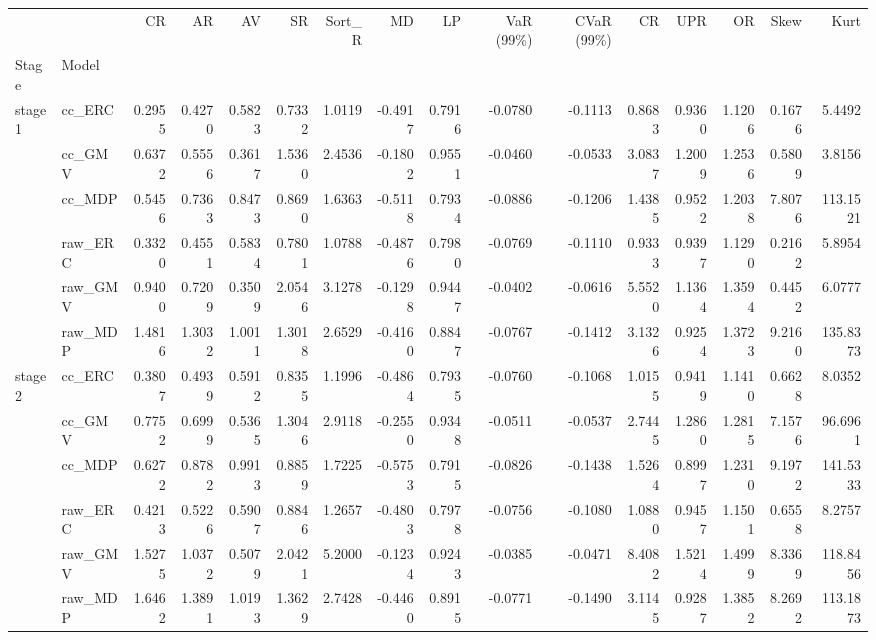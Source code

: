 \begin{tabular}{llrrrrrrrrrrrrrr}
\toprule
 &  & CR & AR & AV & SR & Sort_R & MD & LP & VaR (99\%) & CVaR (99\%) & CR & UPR & OR & Skew & Kurt \\
Stage & Model &  &  &  &  &  &  &  &  &  &  &  &  &  &  \\
\midrule
\multirow[t]{6}{*}{stage1} & cc_ERC & 0.2955 & 0.4270 & 0.5823 & 0.7332 & 1.0119 & -0.4917 & 0.7916 & -0.0780 & -0.1113 & 0.8683 & 0.9360 & 1.1206 & 0.1676 & 5.4492 \\
 & cc_GMV & 0.6372 & 0.5556 & 0.3617 & 1.5360 & 2.4536 & -0.1802 & 0.9551 & -0.0460 & -0.0533 & 3.0837 & 1.2009 & 1.2536 & 0.5809 & 3.8156 \\
 & cc_MDP & 0.5456 & 0.7363 & 0.8473 & 0.8690 & 1.6363 & -0.5118 & 0.7934 & -0.0886 & -0.1206 & 1.4385 & 0.9522 & 1.2038 & 7.8076 & 113.1521 \\
 & raw_ERC & 0.3320 & 0.4551 & 0.5834 & 0.7801 & 1.0788 & -0.4876 & 0.7980 & -0.0769 & -0.1110 & 0.9333 & 0.9397 & 1.1290 & 0.2162 & 5.8954 \\
 & raw_GMV & 0.9400 & 0.7209 & 0.3509 & 2.0546 & 3.1278 & -0.1298 & 0.9447 & -0.0402 & -0.0616 & 5.5520 & 1.1364 & 1.3594 & 0.4452 & 6.0777 \\
 & raw_MDP & 1.4816 & 1.3032 & 1.0011 & 1.3018 & 2.6529 & -0.4160 & 0.8847 & -0.0767 & -0.1412 & 3.1326 & 0.9254 & 1.3723 & 9.2160 & 135.8373 \\
\cline{1-16}
\multirow[t]{6}{*}{stage2} & cc_ERC & 0.3807 & 0.4939 & 0.5912 & 0.8355 & 1.1996 & -0.4864 & 0.7935 & -0.0760 & -0.1068 & 1.0155 & 0.9419 & 1.1410 & 0.6628 & 8.0352 \\
 & cc_GMV & 0.7752 & 0.6999 & 0.5365 & 1.3046 & 2.9118 & -0.2550 & 0.9348 & -0.0511 & -0.0537 & 2.7445 & 1.2860 & 1.2815 & 7.1576 & 96.6961 \\
 & cc_MDP & 0.6272 & 0.8782 & 0.9913 & 0.8859 & 1.7225 & -0.5753 & 0.7915 & -0.0826 & -0.1438 & 1.5264 & 0.8997 & 1.2310 & 9.1972 & 141.5333 \\
 & raw_ERC & 0.4213 & 0.5226 & 0.5907 & 0.8846 & 1.2657 & -0.4803 & 0.7978 & -0.0756 & -0.1080 & 1.0880 & 0.9457 & 1.1501 & 0.6558 & 8.2757 \\
 & raw_GMV & 1.5275 & 1.0372 & 0.5079 & 2.0421 & 5.2000 & -0.1234 & 0.9243 & -0.0385 & -0.0471 & 8.4082 & 1.5214 & 1.4999 & 8.3369 & 118.8456 \\
 & raw_MDP & 1.6462 & 1.3891 & 1.0193 & 1.3629 & 2.7428 & -0.4460 & 0.8915 & -0.0771 & -0.1490 & 3.1145 & 0.9287 & 1.3852 & 8.2692 & 113.1873 \\

\end{tabular}
